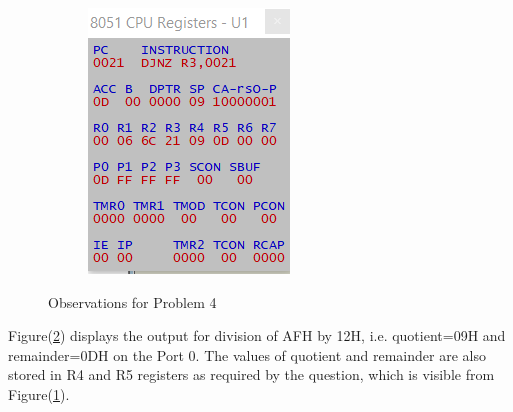 \documentclass{lab_sheet}
\begin{document}
\begin{figure}[H]
\begin{subfigure}{.5\textwidth}
  \includegraphics[frame,width=.8\linewidth]{../Figures/1_4_c.png}   
  \caption{}
  \label{fig:prob4-c}
\end{subfigure}
\hspace*{\fill}
\caption{Observations for Problem 4}
\label{fig:prob4}
\end{figure}
Figure(\ref{fig:prob4}) displays the output for division of AFH by 12H, i.e. quotient=09H and remainder=0DH on the Port 0. The values of quotient and remainder are also stored in R4 and R5 registers as required by the question, which is visible from Figure(\ref{fig:prob4-c}).
\end{document}
